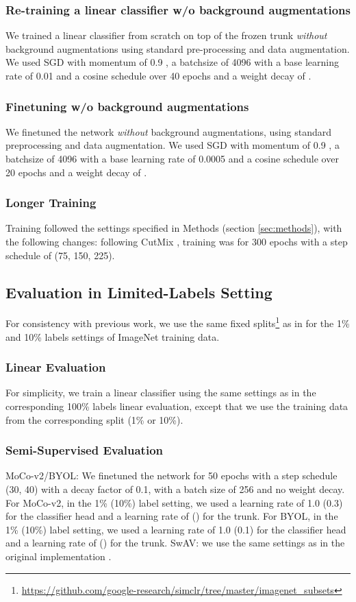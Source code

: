 \documentclass[twoside,11pt]{article}
\newcommand{\moco}{MoCo-v2}
\begin{document}
\subsubsection{Re-training a linear classifier w/o background augmentations}
We trained a linear classifier from scratch on top of the frozen trunk \textit{without} background augmentations using standard pre-processing and data augmentation. We used SGD with momentum of 0.9 , a batchsize of 4096 with a base learning rate of 0.01 and a cosine schedule over 40 epochs and a weight decay of . 

\subsubsection{Finetuning w/o background augmentations}
We finetuned the network \textit{without} background augmentations, using standard preprocessing and data augmentation. We used SGD with momentum of 0.9 , a batchsize of 4096 with a base learning rate of 0.0005 and a cosine schedule  over 20 epochs and a weight decay of .

\subsubsection{Longer Training}
Training followed the settings specified in Methods (section \ref{sec:methods}), with the following changes: following CutMix \citep{yun_cutmix_2019}, training was for 300 epochs with a step schedule of (75, 150, 225).

\subsection{Evaluation in Limited-Labels Setting}

For consistency with previous work, we use the same fixed splits\footnote{\url{https://github.com/google-research/simclr/tree/master/imagenet_subsets}} as in \citet{chen2020big} for the 1\% and 10\% labels settings of ImageNet training data. 

\subsubsection{Linear Evaluation} For simplicity, we train a linear classifier using the same settings as in the corresponding 100\% labels linear evaluation, except that we use the training data from the corresponding split (1\% or 10\%). 

\subsubsection{Semi-Supervised Evaluation}
\moco/BYOL: We finetuned the network for 50 epochs with a step schedule (30, 40) with a decay factor of 0.1, with a batch size of 256 and no weight decay. For \moco, in the 1\% (10\%) label setting, we used a learning rate of 1.0 (0.3) for the classifier head and a learning rate of  () for the trunk. For BYOL, in the 1\% (10\%) label setting, we used a learning rate of 1.0 (0.1) for the classifier head and a learning rate of  () for the trunk.
SwAV: we use the same settings as in the original implementation \citep{swav}. 
\end{document}
